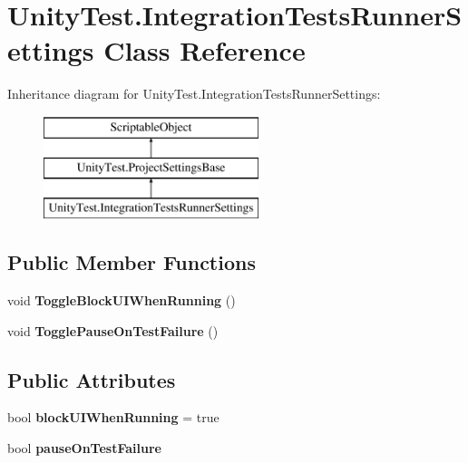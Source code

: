 \hypertarget{class_unity_test_1_1_integration_tests_runner_settings}{}\section{Unity\+Test.\+Integration\+Tests\+Runner\+Settings Class Reference}
\label{class_unity_test_1_1_integration_tests_runner_settings}
Inheritance diagram for Unity\+Test.\+Integration\+Tests\+Runner\+Settings\+:\begin{figure}[H]
\begin{center}
\leavevmode
\includegraphics[height=3.000000cm]{class_unity_test_1_1_integration_tests_runner_settings}
\end{center}
\end{figure}
\subsection*{Public Member Functions}
\begin{DoxyCompactItemize}
\item 
\mbox{\label{class_unity_test_1_1_integration_tests_runner_settings_a1592a06e00fc7f9cc25c4888ec114849}} 
void {\bfseries Toggle\+Block\+U\+I\+When\+Running} ()
\item 
\mbox{\label{class_unity_test_1_1_integration_tests_runner_settings_a5b9d19780a7bad56d27ecfef221fef0c}} 
void {\bfseries Toggle\+Pause\+On\+Test\+Failure} ()
\end{DoxyCompactItemize}
\subsection*{Public Attributes}
\begin{DoxyCompactItemize}
\item 
\mbox{\label{class_unity_test_1_1_integration_tests_runner_settings_a04c78bad8a65b1f1ce4b3f8c01318e7f}} 
bool {\bfseries block\+U\+I\+When\+Running} = true
\item 
\mbox{\label{class_unity_test_1_1_integration_tests_runner_settings_afa9d10adb33a2addfee7e9806ef6f37a}} 
bool {\bfseries pause\+On\+Test\+Failure}
\end{DoxyCompactItemize}
